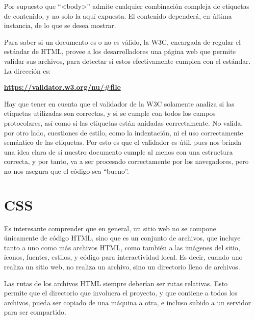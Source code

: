 Por supuesto que ``<body>'' admite cualquier combinación compleja de etiquetas
de contenido, y no solo la aquí expuesta. El contenido dependerá, en última
instancia, de lo que se desea mostrar.

Para saber si un documento es o no es válido, la W3C, encargada de regular
el estándar de HTML, provee a los desarrolladores una página web que permite
validar sus archivos, para detectar si estos efectivamente cumplen con el
estándar. La dirección es:

\textbf{\href{https://validator.w3.org/nu/\#file}{https://validator.w3.org/nu/\#file}}

Hay que tener en cuenta que el validador de la W3C solamente analiza si las
etiquetas utilizadas son correctas, y si se cumple con todos los campos
protocolares, así como si las etiquetas están anidadas correctamente. No valida,
por otro lado, cuestiones de estilo, como la indentación, ni el uso correctamente
semántico de las etiquetas. Por esto es que el validador es útil, pues nos brinda
una idea clara de si nuestro documento cumple al menos con una estructura
correcta, y por tanto, va a ser procesado correctamente por los navegadores,
pero no nos asegura que el código sea ``bueno''.

\section{CSS}

Es interesante comprender que en general, un sitio web no se compone únicamente
de código HTML, sino que es un conjunto de archivos, que incluye tanto a uno
como más archivos HTML, como también a las imágenes del sitio, íconos, fuentes,
estilos, y código para interactividad local. Es decir, cuando uno realiza un
sitio web, no realiza un archivo, sino un directorio lleno de archivos.

Las rutas de los archivos HTML siempre deberían ser rutas relativas. Esto
permite que el directorio que involucra el proyecto, y que contiene a todos
los archivos, pueda ser copiado de una máquina a otra, e incluso subido a un
servidor para ser compartido.

